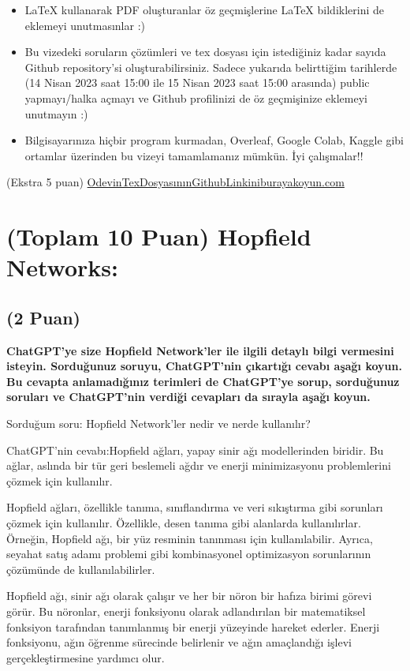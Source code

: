 \documentclass[11pt]{article}
\begin{document}
\begin{itemize}
    \item LaTeX kullanarak PDF oluşturanlar öz geçmişlerine LaTeX bildiklerini de eklemeyi unutmasınlar :)
    \item Bu vizedeki soruların çözümleri ve tex dosyası için istediğiniz kadar sayıda Github repository'si oluşturabilirsiniz. Sadece yukarıda belirttiğim tarihlerde (14 Nisan 2023 saat 15:00 ile 15 Nisan 2023 saat 15:00 arasında) public yapmayı/halka açmayı ve Github profilinizi de öz geçmişinize eklemeyi unutmayın :)
    \item Bilgisayarınıza hiçbir program kurmadan, Overleaf, Google Colab, Kaggle gibi ortamlar üzerinden bu vizeyi tamamlamanız mümkün. İyi çalışmalar!!
\end{itemize}

(Ekstra 5 puan) \url{OdevinTexDosyasınınGithubLinkiniburayakoyun.com}

\newpage
\section{(Toplam 10 Puan) Hopfield Networks:}

\subsection{(2 Puan)} \textbf{ChatGPT’ye size Hopfield Network’ler ile ilgili detaylı bilgi vermesini isteyin. Sorduğunuz soruyu, ChatGPT'nin çıkartığı cevabı aşağı koyun. Bu cevapta anlamadığınız terimleri de ChatGPT’ye sorup, sorduğunuz soruları ve ChatGPT’nin verdiği cevapları da sırayla aşağı koyun.}

\item Sorduğum soru: Hopfield Network’ler nedir ve nerde kullanılır?
\item ChatGPT'nin cevabı:Hopfield ağları, yapay sinir ağı modellerinden biridir. Bu ağlar, aslında bir tür geri beslemeli ağdır ve enerji minimizasyonu problemlerini çözmek için kullanılır.

Hopfield ağları, özellikle tanıma, sınıflandırma ve veri sıkıştırma gibi sorunları çözmek için kullanılır. Özellikle, desen tanıma gibi alanlarda kullanılırlar. Örneğin, Hopfield ağı, bir yüz resminin tanınması için kullanılabilir. Ayrıca, seyahat satış adamı problemi gibi kombinasyonel optimizasyon sorunlarının çözümünde de kullanılabilirler.

Hopfield ağı, sinir ağı olarak çalışır ve her bir nöron bir hafıza birimi görevi görür. Bu nöronlar, enerji fonksiyonu olarak adlandırılan bir matematiksel fonksiyon tarafından tanımlanmış bir enerji yüzeyinde hareket ederler. Enerji fonksiyonu, ağın öğrenme sürecinde belirlenir ve ağın amaçlandığı işlevi gerçekleştirmesine yardımcı olur.
\end{document}
